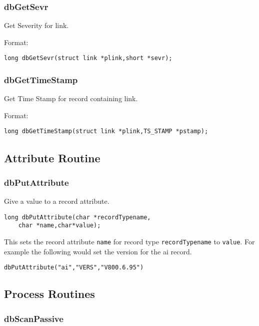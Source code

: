 \subsubsection{dbGetSevr}

Get Severity for link.

Format:

\begin{verbatim}
long dbGetSevr(struct link *plink,short *sevr);
\end{verbatim}

\subsubsection{dbGetTimeStamp}

Get Time Stamp for record containing link.

Format:

\begin{verbatim}
long dbGetTimeStamp(struct link *plink,TS_STAMP *pstamp);
\end{verbatim}

\subsection{Attribute Routine}

\subsubsection{dbPutAttribute}

Give a value to a record attribute.

\begin{verbatim}
long dbPutAttribute(char *recordTypename,
    char *name,char*value);
\end{verbatim}

This sets the record attribute \verb|name| for record type \verb|recordTypename| to \verb|value|. For example the following would set 
the version for the ai record.

\begin{verbatim}
dbPutAttribute("ai","VERS","V800.6.95")
\end{verbatim}

\subsection{Process Routines}

\subsubsection{dbScanPassive}

